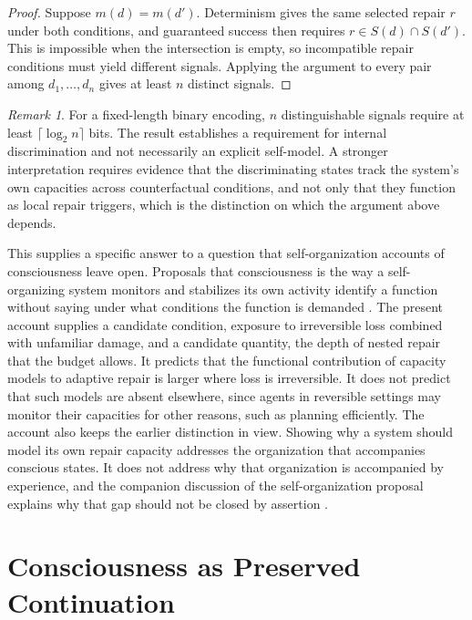 \documentclass[11pt]{article}
\theoremstyle{definition}
\theoremstyle{plain}
\theoremstyle{remark}
\newtheorem*{remark}{Remark}
\begin{document}
\begin{proof}
Suppose $m(d) = m(d')$. Determinism gives the same selected repair $r$ under both conditions, and guaranteed success then requires $r \in S(d) \cap S(d')$. This is impossible when the intersection is empty, so incompatible repair conditions must yield different signals. Applying the argument to every pair among $d_1, \ldots, d_n$ gives at least $n$ distinct signals.
\end{proof}

\begin{remark}
For a fixed-length binary encoding, $n$ distinguishable signals require at least $\lceil \log_2 n \rceil$ bits. The result establishes a requirement for internal discrimination and not necessarily an explicit self-model. A stronger interpretation requires evidence that the discriminating states track the system's own capacities across counterfactual conditions, and not only that they function as local repair triggers, which is the distinction on which the argument above depends.
\end{remark}

This supplies a specific answer to a question that self-organization accounts of consciousness leave open. Proposals that consciousness is the way a self-organizing system monitors and stabilizes its own activity identify a function without saying under what conditions the function is demanded \cite{mlst2026}. The present account supplies a candidate condition, exposure to irreversible loss combined with unfamiliar damage, and a candidate quantity, the depth of nested repair that the budget allows. It predicts that the functional contribution of capacity models to adaptive repair is larger where loss is irreversible. It does not predict that such models are absent elsewhere, since agents in reversible settings may monitor their capacities for other reasons, such as planning efficiently. The account also keeps the earlier distinction in view. Showing why a system should model its own repair capacity addresses the organization that accompanies conscious states. It does not address why that organization is accompanied by experience, and the companion discussion of the self-organization proposal explains why that gap should not be closed by assertion \cite{flyxion2026critique}.

\section{Consciousness as Preserved Continuation}
\end{document}
